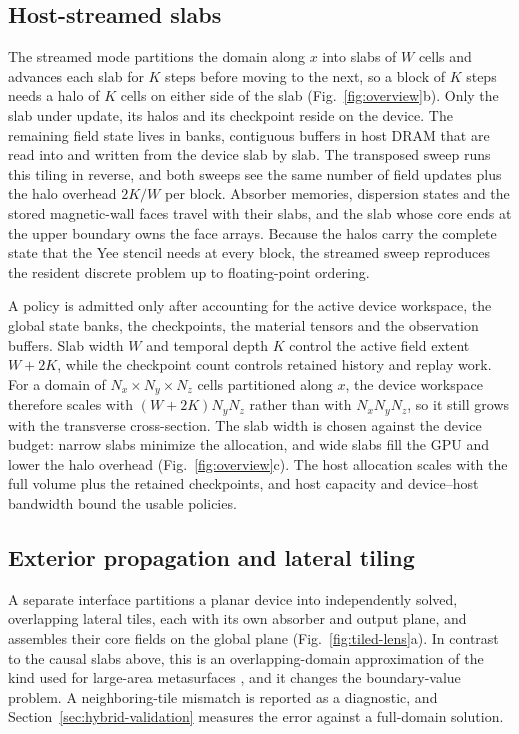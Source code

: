 \documentclass[11pt,a4paper]{article}
\begin{document}
\subsection{Host-streamed slabs}
\label{sec:streaming}

The streamed mode partitions the domain along $x$ into slabs of $W$ cells and advances each slab for $K$ steps before moving to the next, so a block of $K$ steps needs a halo of $K$ cells on either side of the slab (Fig.~\ref{fig:overview}b). Only the slab under update, its halos and its checkpoint reside on the device. The remaining field state lives in banks, contiguous buffers in host DRAM that are read into and written from the device slab by slab. The transposed sweep runs this tiling in reverse, and both sweeps see the same number of field updates plus the halo overhead $2K/W$ per block. Absorber memories, dispersion states and the stored magnetic-wall faces travel with their slabs, and the slab whose core ends at the upper boundary owns the face arrays. Because the halos carry the complete state that the Yee stencil needs at every block, the streamed sweep reproduces the resident discrete problem up to floating-point ordering.

A policy is admitted only after accounting for the active device workspace, the global state banks, the checkpoints, the material tensors and the observation buffers. Slab width $W$ and temporal depth $K$ control the active field extent $W+2K$, while the checkpoint count controls retained history and replay work. For a domain of $N_x\times N_y\times N_z$ cells partitioned along $x$, the device workspace therefore scales with $(W+2K)N_yN_z$ rather than with $N_xN_yN_z$, so it still grows with the transverse cross-section. The slab width is chosen against the device budget: narrow slabs minimize the allocation, and wide slabs fill the GPU and lower the halo overhead (Fig.~\ref{fig:overview}c). The host allocation scales with the full volume plus the retained checkpoints, and host capacity and device--host bandwidth bound the usable policies.

\subsection{Exterior propagation and lateral tiling}
\label{sec:hybrid}

A separate interface partitions a planar device into independently solved, overlapping lateral tiles, each with its own absorber and output plane, and assembles their core fields on the global plane (Fig.~\ref{fig:tiled-lens}a). In contrast to the causal slabs above, this is an overlapping-domain approximation of the kind used for large-area metasurfaces \citep{pestourie2018,lin2019}, and it changes the boundary-value problem. A neighboring-tile mismatch is reported as a diagnostic, and Section~\ref{sec:hybrid-validation} measures the error against a full-domain solution.
\end{document}
